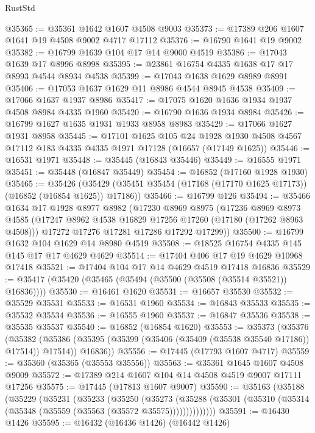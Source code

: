 \begin{lexlean}{RustStd}
\begin{coremodule}
{\begin{coremodule}
{{{{{{{{{{{{{{{{{{{{{{{{{{{{{{{{{{{{{{{{{{{{{{{{{{{{{{{@35365 := @35361 @1642 @1607 @4508 @9003
@35373 := @17389 @206 @1607 @1641 @19 @4508 @9002 @4717 @17112
@35376 := @16790 @1641 @19 @9002
@35382 := @16799 @1639 @104 @17 @14 @9000 @4519
@35386 := @17043 @1639 @17 @8996 @8998
@35395 := @23861 @16754 @4335 @1638 @17 @17 @8993 @4544 @8934 @4538
@35399 := @17043 @1638 @1629 @8989 @8991
@35406 := @17053 @1637 @1629 @11 @8986 @4544 @8945 @4538
@35409 := @17066 @1637 @1937 @8986
@35417 := @17075 @1620 @1636 @1934 @1937 @4508 @8984 @4335 @1960
@35420 := @16790 @1636 @1934 @8984
@35426 := @16799 @1627 @1635 @1931 @1933 @8958 @8983
@35429 := @17066 @1627 @1931 @8958
@35445 := @17101
    @1625
    @105
    @24
    @1928
    @1930
    @4508
    @4567
    @17112
    @183
    @4335
    @4335
    @1971
    @17128
    (@16657 (@17149 @1625))
@35446 := @16531 @1971
@35448 := @35445 (@16843 @35446)
@35449 := @16555 @1971
@35451 := @35448 (@16847 @35449)
@35454 := @16852 (@17160 @1928 @1930)
@35465 := @35426
    (@35429 (@35451 @35454 (@17168 (@17170 @1625 @17173)) (@16852 (@16854 @1625)) @17186))
@35466 := @16799 @126
@35494 := @35466
    @1634
    @17
    @1928
    @8977
    @8982
    (@17230
      @8969
      @8975
      (@17236
        @8969
        @8973
        @4585
        (@17247 @8962 @4538 @16829 @17256 @17260 (@17180 (@17262 @8963 @4508)))
        @17272
        @17276
        @17281
        @17286
        @17292
        @17299))
@35500 := @16799 @1632 @104 @1629 @14 @8980 @4519
@35508 := @18525 @16754 @4335 @145 @145 @17 @17 @4629 @4629
@35514 := @17404 @406 @17 @19 @4629 @10968 @17418
@35521 := @17404 @104 @17 @14 @4629 @4519 @17418 @16836
@35529 := @35417 (@35420 (@35465 (@35494 (@35500 (@35508 (@35514 @35521)) @16836))))
@35530 := @16461 @1620
@35531 := @16657 @35530
@35532 := @35529 @35531
@35533 := @16531 @1960
@35534 := @16843 @35533
@35535 := @35532 @35534
@35536 := @16555 @1960
@35537 := @16847 @35536
@35538 := @35535 @35537
@35540 := @16852 (@16854 @1620)
@35553 := @35373
    (@35376
      (@35382
        (@35386 (@35395 (@35399 (@35406 (@35409 (@35538 @35540 @17186)) @17514)) @17514))
        @16836))
@35556 := @17445 (@17793 @1607 @4717)
@35559 := @35360 (@35365 (@35553 @35556))
@35563 := @35361 @1645 @1607 @4508 @9009
@35572 := @17389 @214 @1607 @104 @14 @4508 @4519 @9007 @17111 @17256
@35575 := @17445 (@17813 @1607 @9007)
@35590 := @35163
    (@35188
      (@35229
        (@35231
          (@35233
            (@35250
              (@35273
                (@35288 (@35301 (@35310 (@35314 (@35348 (@35559 (@35563 (@35572 @35575))))))))))))))
@35591 := @16430 @1426
@35595 := @16432 (@16436 @1426) (@16442 @1426)
}}}}}}}}}}}}}}}}}}}}}}}}}}}}}}}}}}}}}}}}}}}}}}}}}}}}}}}
\end{coremodule}}
\end{coremodule}
\end{lexlean}

